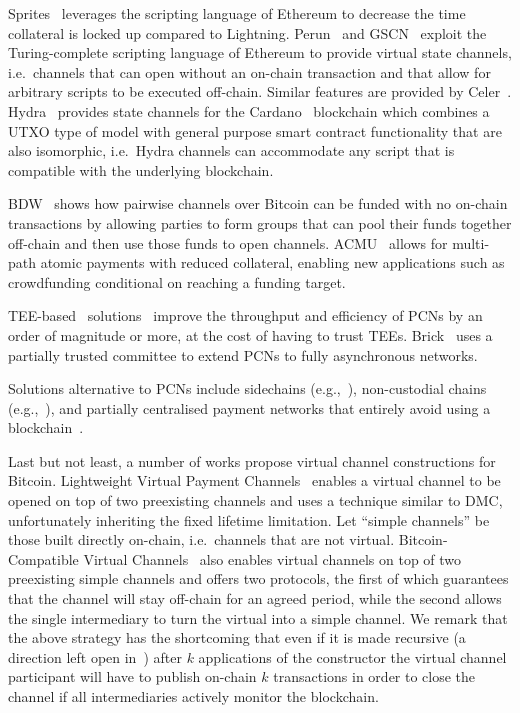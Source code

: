   Sprites~\cite{sprites} leverages the scripting language of Ethereum to
  decrease the time collateral is locked up compared to Lightning.
  Perun~\cite{perun} and GSCN~\cite{DBLP:conf/ccs/DziembowskiFH18} exploit the
  Turing-complete scripting language of Ethereum to provide virtual state
  channels, i.e.\ channels that can open without an on-chain transaction and that
  allow for arbitrary scripts to be executed off-chain. Similar features are
  provided by Celer~\cite{dong2018celer}. Hydra~\cite{cryptoeprint:2020:299}
  provides state channels for the Cardano~\cite{cardano} blockchain which
  combines a UTXO type of model with general purpose smart contract
  functionality that are also isomorphic, i.e.\ Hydra channels can accommodate
  any script that is compatible with the underlying blockchain.

  BDW~\cite{scalable-funding} shows how pairwise channels over Bitcoin can be   funded with no on-chain transactions by allowing parties to form groups that   can pool their funds together off-chain and then use those funds to open   channels. ACMU~\cite{10.1145/3319535.3345666} allows for multi-path atomic   payments with reduced collateral, enabling new applications such as   crowdfunding conditional on reaching a funding target.

  TEE-based~\cite{zhao2019sok}
solutions~\cite{teechan,10.1145/3341301.3359627,liao2021speedster,lee2020routee}
  improve the throughput and efficiency of PCNs by an order of magnitude or
  more, at the cost of having to trust TEEs. Brick~\cite{avarikioti2020brick}
  uses a partially trusted committee to extend PCNs to fully asynchronous
  networks.

  Solutions alternative to PCNs include 
side\-chains (e.g.,~\cite{BCDF+14,sidechains,KiaZin18}),
non-custo\-dial chains (e.g.,~\cite{plasma,konstantopoulos2019plasma,plasma-lower-bounds,rollup}),
  and partially centralised payment networks that entirely avoid using a blockchain~\cite{DBLP:conf/trust/ArmknechtKMYZ15,stellar,silentwhispers,DBLP:conf/ndss/RoosMKG18}. 

  Last but not least, a number of works propose virtual channel constructions
  for Bitcoin. Lightweight Virtual Payment
  Channels~\cite{10.1007/978-3-030-65411-5_18} enables a virtual channel to be
  opened on top of two preexisting channels and uses a technique similar to DMC,
  unfortunately inheriting the fixed lifetime limitation.
  Let ``simple channels'' be those built directly on-chain, i.e.\ channels that are not
  virtual.
  Bitcoin-Compatible Virtual Channels~\cite{cryptoeprint:2020:554} also enables
  virtual channels on top of two preexisting simple channels
  and offers two protocols, the first of which guarantees that the channel will
  stay off-chain for an agreed period, while the second allows the single intermediary
  to turn the virtual into a simple channel.
  We remark that the above strategy has the shortcoming that even if it is made
  recursive (a direction left open in~\cite{cryptoeprint:2020:554}) after $k$
  applications of the constructor the virtual channel participant will have to
  publish on-chain $k$ transactions in order to close the channel if all
  intermediaries actively monitor the blockchain.

